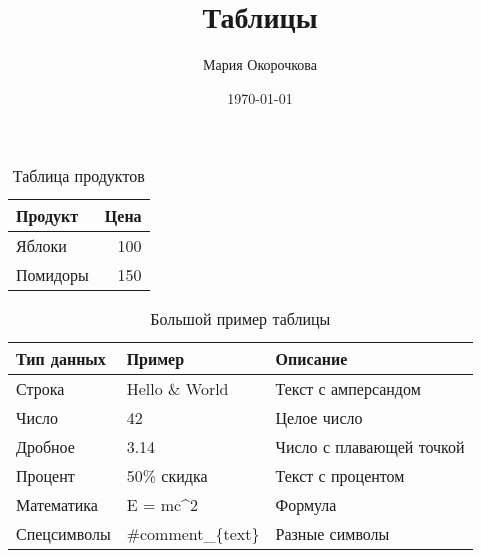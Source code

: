 \documentclass{article}
\title{Таблицы}
\author{Мария Окорочкова}
\date{\today}
\begin{document}
\maketitle

\begin{table}[htbp]
\centering
\begin{tabular}{l r}
\hline
Продукт & Цена \\
\hline
Яблоки & 100 \\
Помидоры & 150 \\
\hline
\end{tabular}
\caption{Таблица продуктов}
\label{tab:products}
\end{table}

\begin{table}[htbp]
\centering
\begin{tabular}{l l p{6cm}}
\hline
Тип данных & Пример & Описание \\
\hline
Строка & Hello \& World & Текст с амперсандом \\
Число & 42 & Целое число \\
Дробное & 3.14 & Число с плавающей точкой \\
Процент & 50\% скидка & Текст с процентом \\
Математика & E = mc^2 & Формула \\
Спецсимволы & \#comment\_\{text\} & Разные символы \\
\hline
\end{tabular}
\caption{Большой пример таблицы}
\label{tab:complex_data}
\end{table}
\end{document}

